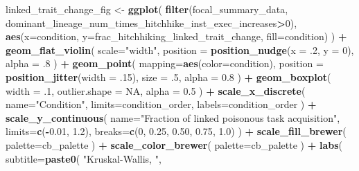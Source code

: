 \documentclass[]{book}
\newenvironment{Shaded}{\begin{snugshade}}{\end{snugshade}}
\newcommand{\DataTypeTok}[1]{\textcolor[rgb]{0.13,0.29,0.53}{#1}}
\newcommand{\DecValTok}[1]{\textcolor[rgb]{0.00,0.00,0.81}{#1}}
\newcommand{\FloatTok}[1]{\textcolor[rgb]{0.00,0.00,0.81}{#1}}
\newcommand{\KeywordTok}[1]{\textcolor[rgb]{0.13,0.29,0.53}{\textbf{#1}}}
\newcommand{\NormalTok}[1]{#1}
\newcommand{\OperatorTok}[1]{\textcolor[rgb]{0.81,0.36,0.00}{\textbf{#1}}}
\newcommand{\OtherTok}[1]{\textcolor[rgb]{0.56,0.35,0.01}{#1}}
\newcommand{\StringTok}[1]{\textcolor[rgb]{0.31,0.60,0.02}{#1}}
\begin{document}
\begin{Shaded}
\begin{Highlighting}[]
{{{{\NormalTok{linked_trait_change_fig <-}\StringTok{ }\KeywordTok{ggplot}\NormalTok{(}
    \KeywordTok{filter}\NormalTok{(focal_summary_data, dominant_lineage_num_times_hitchhike_inst_exec_increases}\OperatorTok{>}\DecValTok{0}\NormalTok{),}
    \KeywordTok{aes}\NormalTok{(}\DataTypeTok{x=}\NormalTok{condition, }\DataTypeTok{y=}\NormalTok{frac_hitchhiking_linked_trait_change, }\DataTypeTok{fill=}\NormalTok{condition)}
\NormalTok{  ) }\OperatorTok{+}
\StringTok{  }\KeywordTok{geom_flat_violin}\NormalTok{(}
    \DataTypeTok{scale=}\StringTok{"width"}\NormalTok{,}
    \DataTypeTok{position =} \KeywordTok{position_nudge}\NormalTok{(}\DataTypeTok{x =} \FloatTok{.2}\NormalTok{, }\DataTypeTok{y =} \DecValTok{0}\NormalTok{),}
    \DataTypeTok{alpha =} \FloatTok{.8}
\NormalTok{  ) }\OperatorTok{+}
\StringTok{  }\KeywordTok{geom_point}\NormalTok{(}
    \DataTypeTok{mapping=}\KeywordTok{aes}\NormalTok{(}\DataTypeTok{color=}\NormalTok{condition),}
    \DataTypeTok{position =} \KeywordTok{position_jitter}\NormalTok{(}\DataTypeTok{width =} \FloatTok{.15}\NormalTok{),}
    \DataTypeTok{size =} \FloatTok{.5}\NormalTok{,}
    \DataTypeTok{alpha =} \FloatTok{0.8}
\NormalTok{  ) }\OperatorTok{+}
\StringTok{  }\KeywordTok{geom_boxplot}\NormalTok{(}
    \DataTypeTok{width =} \FloatTok{.1}\NormalTok{,}
    \DataTypeTok{outlier.shape =} \OtherTok{NA}\NormalTok{,}
    \DataTypeTok{alpha =} \FloatTok{0.5}
\NormalTok{  ) }\OperatorTok{+}
\StringTok{  }\KeywordTok{scale_x_discrete}\NormalTok{(}
    \DataTypeTok{name=}\StringTok{"Condition"}\NormalTok{,}
    \DataTypeTok{limits=}\NormalTok{condition_order,}
    \DataTypeTok{labels=}\NormalTok{condition_order}
\NormalTok{  ) }\OperatorTok{+}
\StringTok{  }\KeywordTok{scale_y_continuous}\NormalTok{(}
    \DataTypeTok{name=}\StringTok{"Fraction of linked poisonous task acquisition"}\NormalTok{,}
    \DataTypeTok{limits=}\KeywordTok{c}\NormalTok{(}\OperatorTok{-}\FloatTok{0.01}\NormalTok{, }\FloatTok{1.2}\NormalTok{),}
    \DataTypeTok{breaks=}\KeywordTok{c}\NormalTok{(}\DecValTok{0}\NormalTok{, }\FloatTok{0.25}\NormalTok{, }\FloatTok{0.50}\NormalTok{, }\FloatTok{0.75}\NormalTok{, }\FloatTok{1.0}\NormalTok{)}
\NormalTok{  ) }\OperatorTok{+}
\StringTok{  }\KeywordTok{scale_fill_brewer}\NormalTok{(}
    \DataTypeTok{palette=}\NormalTok{cb_palette}
\NormalTok{  ) }\OperatorTok{+}
\StringTok{  }\KeywordTok{scale_color_brewer}\NormalTok{(}
    \DataTypeTok{palette=}\NormalTok{cb_palette}
\NormalTok{  ) }\OperatorTok{+}
\StringTok{  }\KeywordTok{labs}\NormalTok{(}
    \DataTypeTok{subtitle=}\KeywordTok{paste0}\NormalTok{(}
      \StringTok{"Kruskal-Wallis, "}\NormalTok{,}
}}}}
\end{Highlighting}
\end{Shaded}
\end{document}
